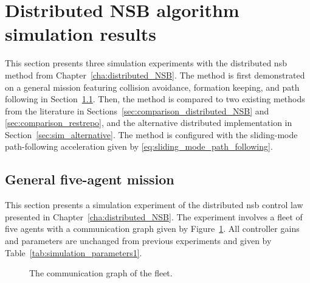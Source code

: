 \section{Distributed NSB algorithm simulation results}\label{sec:distributed_simulations}
This section presents three simulation experiments with the distributed \gls{nsb} method from Chapter~\ref{cha:distributed_NSB}. The method is first demonstrated on a general mission featuring collision avoidance, formation keeping, and path following in Section~\ref{sec:simulation_distributed_nsb}. Then, the method is compared to two existing methods from the literature in Sections~\ref{sec:comparison_distributed_NSB} and \ref{sec:comparison_restrepo}, and the alternative distributed implementation in Section~\ref{sec:sim_alternative}. The method is configured with the sliding-mode path-following acceleration given by \eqref{eq:sliding_mode_path_following}.


\subsection{General five-agent mission}\label{sec:simulation_distributed_nsb}
This section presents a simulation experiment of the distributed \gls{nsb} control law presented in Chapter~\ref{cha:distributed_NSB}. The experiment involves a fleet of five agents with a communication graph given by Figure~\ref{fig:communication_graph}. All controller gains and parameters are unchanged from previous experiments and given by Table~\ref{tab:simulation_parameters1}.
\begin{figure}[h]
    \centering
\vspace*{-4mm}
    \caption{The communication graph of the fleet.}
    \label{fig:communication_graph}
    \vspace*{-4mm}
\end{figure}


